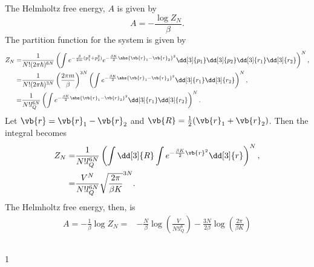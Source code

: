 \documentclass[a4paper,12pt,twoside]{article}
\newcommand{\mcols}{0}
\begin{document}
\begin{multicols*}{2}
\subsection{}%
\subsubsection{}
The Helmholtz free energy, $A$ is given by
\begin{equation}
	A = -\frac{\log Z_N}{\beta}.
\end{equation}
The partition function for the system is given by
\begin{align}
	Z_N =& \frac{1}{N!(2\pi\hbar)^{6N}}\left( \int e^{-\frac{\beta}{2m}(p_1^2+p_2^2)}e^{-\frac{\beta K}{2}\abs{\vb{r}_1-\vb{r}_2}^2}\dd[3]{p_1}\dd[3]{p_2}\dd[3]{r_1}\dd[3]{r_2}\right)^N,\\
	=& \frac{1}{N!(2\pi\hbar)^{3N}} \left(\frac{2\pi m}{\beta}\right)^{3N}\left( \int e^{-\frac{\beta K}{2}\abs{\vb{r}_1-\vb{r}_2}^2}\dd[3]{r_1}\dd[3]{r_2}\right)^N,\\
	=& \frac{1}{N!l_Q^{6N}}\left(\int e^{-\frac{\beta K}{2}\abs{\vb{r}_1-\vb{r}_2}^2}\dd[3]{r_1}\dd[3]{r_2}\right)^N.
\end{align}
Let $\vb{r} = \vb{r}_1 - \vb{r}_2$ and $\vb{R} = \frac{1}{2}(\vb{r}_1 + \vb{r}_2)$.
Then the integral becomes
\begin{align}
	Z_N =& \frac{1}{N!l_Q^{6N}}\left(\int \dd[3]{R}\int e^{-\frac{\beta K}{2}\vb{r}^2}\dd[3]{r}\right)^N,\\
	=& \frac{V^N}{N!l_Q^{6N}} \sqrt{\frac{2\pi}{\beta K}}^{3N}.
\end{align}
The Helmholtz free energy, then, is
\begin{align}
	A = -\frac{1}{\beta}\log{Z_N} =& -\frac{N}{\beta} \log(\frac{V}{N!l_Q^6})-\frac{3N}{2\beta}\log(\frac{2\pi}{\beta K})
\end{align}
\subsubsection{}
\subsubsection{}
\subsection{}%
\subsubsection{}
\subsubsection{}
\subsubsection{}


\printBib


\if\mcols1
\end{multicols*}
\fi
\end{document}
